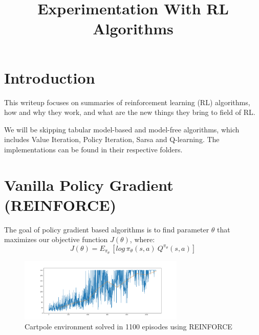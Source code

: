 \documentclass[11pt]{article} %
\title{Experimentation With RL Algorithms}
\author{}
\date{}
\begin{document}
\maketitle

\tableofcontents

\newpage

\section{Introduction}
This writeup focuses on summaries of reinforcement learning (RL) algorithms, how and why they work, and what are the new things they bring to field of RL.

We will be skipping tabular model-based and model-free algorithms, which includes Value Iteration, Policy Iteration, Sarsa and Q-learning. The implementations can be found in their respective folders.
\section{Vanilla Policy Gradient (REINFORCE)}
The goal of policy gradient based algorithms is to find parameter $\theta$ that maximizes our objective function $J(\theta)$, where:
\begin{equation*}
    J(\theta) = E_{\pi_\theta}\,[log\,\pi_\theta(s,a)\: Q^{\pi_\theta}(s,a)]
\end{equation*}
\begin{figure}
    \centering
    \includegraphics[width=0.7\textwidth]{vanilla_policy_gradient/Solved_cartpole_1100eps.png}
    \caption{Cartpole environment solved in 1100 episodes using REINFORCE}
\end{figure}
\end{document}
